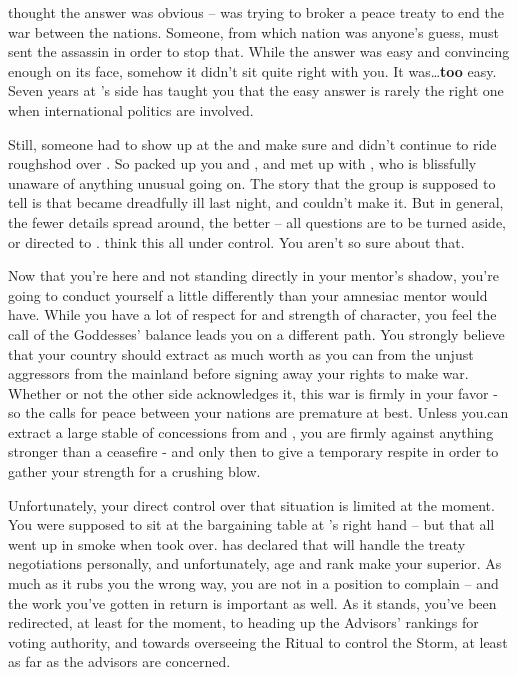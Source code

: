\documentclass[char]{GL2020}
\begin{document}
\cEbbPriest{} thought the answer was obvious -- \cHeadDiplomat{} was trying to broker a peace treaty to end the war between the nations. Someone, from which nation was anyone’s guess, must sent the assassin in order to stop that. While the answer was easy and convincing enough on its face, somehow it didn’t sit quite right with you. It was\ldots \textbf{too} easy. Seven years at \cHeadDiplomat{}’s side has taught you that the easy answer is rarely the right one when international politics are involved.

Still, someone had to show up at the \pSchool{} and make sure \pTech{} and \pFarm{} didn’t continue to ride roughshod over \pShip{}. So \cEbbPriest{} packed up you and  \cChupLeader{}, and met up with \cBunker{}, who is blissfully unaware of anything unusual going on. The story that the group is supposed to tell is that \cHeadDiplomat{} became dreadfully ill last night, and couldn’t make it. But in general, the fewer details spread around, the better -- all questions are to be turned aside, or directed to \cEbbPriest{}. \cEbbPriest{\They} think  \cEbbPriest{\have} this all under control. You aren’t so sure about that.

Now that you’re here and not standing directly in your mentor’s shadow, you’re going to conduct yourself a little differently than your amnesiac mentor would have. While you have a lot of respect for \cHeadDiplomat{} and \cHeadDiplomat{\their} strength of character, you feel the call of the Goddesses’ balance leads you on a different path. You strongly believe that your country should extract as much worth as you can from the unjust aggressors from the mainland before signing away your rights to make war. Whether or not the other side acknowledges it, this war is firmly in your favor - so the calls for peace between your nations are premature at best. Unless you.can extract a large stable of concessions from \pTech{} and \pFarm{}, you are firmly against anything stronger than a ceasefire - and only then to give a temporary respite in order to gather your strength for a crushing blow.

Unfortunately, your direct control over that situation is limited at the moment. You were supposed to sit at the bargaining table at \cHeadDiplomat{}’s right hand -- but that all went up in smoke when \cEbbPriest{} took over. \cEbbPriest{} has declared that \cEbbPriest{\they} will handle the treaty negotiations personally, and unfortunately, \cEbbPriest{\their} age and rank make \cEbbPriest{\them} your superior. As much as it rubs you the wrong way, you are not in a position to complain -- and the work you’ve gotten in return is important as well. As it stands, you’ve been redirected, at least for the moment, to heading up the Advisors’ rankings for voting authority, and towards overseeing the Ritual to control the Storm, at least as far as the \pShip{} advisors are concerned. 
\end{document}
